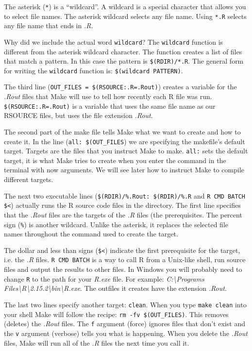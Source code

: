 The asterisk (\verb|*|) is a ``wildcard''. A wildcard is a special character that allows you to select file names. The asterisk wildcard selects any file name. Using \verb|*.R| selects any file name that ends in \emph{.R}.  

Why did we include the actual word \texttt{wildcard}? The \texttt{wildcard} function is different from the asterisk wildcard character. The function creates a list of files that match a pattern. In this case the pattern is \verb|$(RDIR)/*.R|. The general form for writing the \texttt{wildcard} function is: \verb|$(wildcard PATTERN)|.

The third line (\verb|OUT_FILES = $(RSOURCE:.R=.Rout)|) creates a variable for the \emph{.Rout} files that Make will use to tell how recently each R file was run. \verb|$(RSOURCE:.R=.Rout)| is a variable that uses the same file name as our RSOURCE files, but uses the file extension \emph{.Rout}.

The second part of the make file tells Make what we want to create and how to create it. In the line (\verb|all: $(OUT_FILES|) we are specifying the makefile's default target. Targets are the files that you instruct Make to make. \texttt{all:} sets the default target, it is what Make tries to create when you enter the command  in the terminal with now arguments. We will see later how to instruct Make to compile different targets.

The next two executable lines (\verb|$(RDIR)/%.Rout: $(RDIR)/%.R| and \verb|R CMD BATCH $<|) actually runs the R source code files in the directory.  The first line specifies that the \emph{.Rout} files are the targets of the \emph{.R} files (the prerequisites. The percent sign (\verb|%|) is another wildcard. Unlike the asterisk, it replaces the selected file names throughout the command used to create the target.

The dollar and less than signs (\verb|$<|) indicate the first prerequisite for the target, i.e. the \emph{.R} files. \texttt{R CMD BATCH} is a way to call R from a Unix-like shell, run source files and output the results to other files. In Windows you will probably need to change \texttt{R} to the path for your \emph{R.exe} file. For example: \emph{C:\textbackslash{}Programs Files\textbackslash{}R\textbackslash{}2.15.2\textbackslash{}bin\textbackslash{}R.exe}. The outfiles it creates have the extension \emph{.Rout}.

The last two lines specify another target: \texttt{clean}. When you type \texttt{make clean} into your shell Make will follow the recipe: \verb|rm -fv $(OUT_FILES)|. This removes (deletes) the \emph{.Rout} files. The \texttt{f} argument (force) ignores  files that don't exist and the \texttt{v} argument (verbose) tells you what is happening. When you delete the \emph{.Rout} files, Make will run all of the \emph{.R} files the next time you call it.

